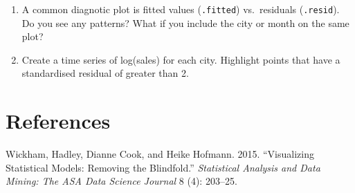 \begin{enumerate}
\def\labelenumi{\arabic{enumi}.}
\item
  A common diagnotic plot is fitted values (\texttt{.fitted})
  vs.~residuals (\texttt{.resid}). Do you see any patterns? What if you
  include the city or month on the same plot?
\item
  Create a time series of log(sales) for each city. Highlight points
  that have a standardised residual of greater than 2.
\end{enumerate}

\section*{References}

Wickham, Hadley, Dianne Cook, and Heike Hofmann. 2015. ``Visualizing
Statistical Models: Removing the Blindfold.'' \emph{Statistical Analysis
and Data Mining: The ASA Data Science Journal} 8 (4): 203--25.
